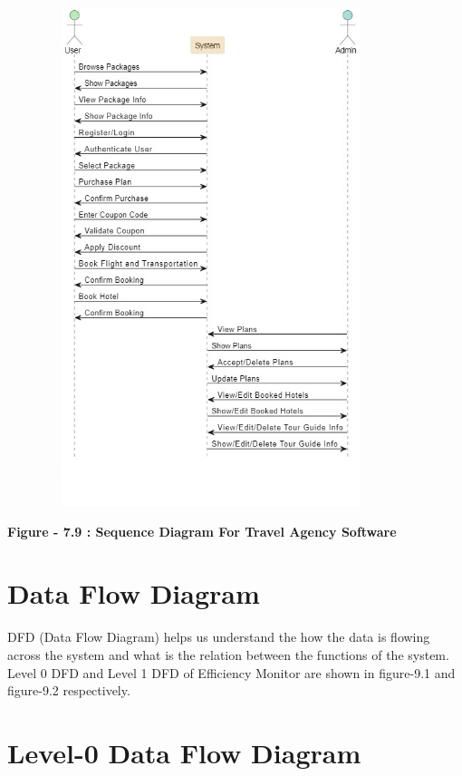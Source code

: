 \documentclass{scrreprt}
\begin{document}
{\includegraphics[width=450px, height=550px]{sqd.jpg}}

\begin{center}
    \parbox{0.8\textwidth}{ 
        \centering
        \textbf{Figure - 7.9 : Sequence Diagram For Travel Agency Software}
    }
\end{center}


\section{Data Flow Diagram}
DFD (Data Flow Diagram) helps us understand the how the data is flowing across the system and
what is the relation between the functions of the system.
Level 0 DFD and Level 1 DFD of Efficiency Monitor are shown in figure-9.1 and figure-9.2
respectively.





\section {Level-0 Data Flow Diagram}
\end{document}

